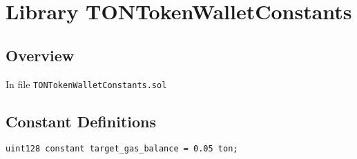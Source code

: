 
\chapter{Library TONTokenWalletConstants}

\minitoc

\section{Overview}


In file {\tt TONTokenWalletConstants.sol}

\section{Constant Definitions}


\begin{lstlisting}[firstnumber=4]
    uint128 constant target_gas_balance = 0.05 ton;
\end{lstlisting}

